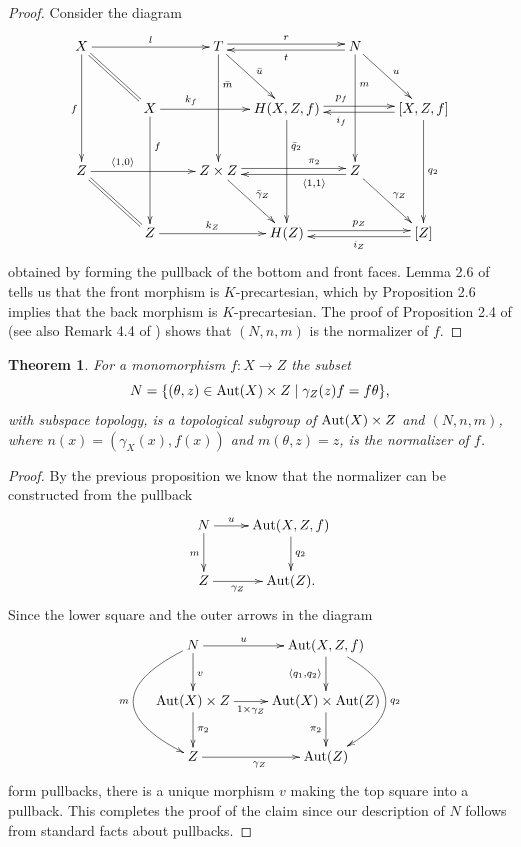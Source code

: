 \documentclass{article}
\newcommand{\Aut}{\textnormal{Aut}}
\newtheorem{theorem}{Theorem}[section]
\begin{document}
\begin{proof}
Consider the diagram
\[
\xymatrix@!@C=-1ex@R=-2ex{
X
\ar[rr]^-{l}
\ar[dd]_{f}
\ar@{=}[rd]
&
&
T
\ar@<0.5ex>[rr]^-{r}
\ar[dd]^(0.3){\bar m}
\ar[rd]^{\bar u}
&
&
N
\ar@<0.5ex>[ll]^-{t}
\ar[dd]^(0.3){m}
\ar[rd]^{u}
\\
&
X
\ar[dd]^(0.3){f}
\ar[rr]^(0.3){k_f}
&
&
H(X,Z,f)
\ar@<0.5ex>[rr]^(0.4){p_f}
\ar[dd]^(0.3){\bar q_2}
&
&
[X,Z,f]
\ar@<0.5ex>[ll]^(0.6){i_f}
\ar[dd]^{q_2}
\\
Z
\ar[rr]^(0.3){\langle 1,0\rangle}
\ar@{=}[rd]
&
&
Z\times Z
\ar@<0.5ex>[rr]^(0.7){\pi_2}
\ar[rd]^{\bar \gamma_Z}
&
&
Z
\ar@<0.5ex>[ll]^(0.3){\langle 1,1 \rangle}
\ar[rd]^{\gamma_Z}
\\
&
Z
\ar[rr]^-{k_Z}
&
&
H(Z)
\ar@<0.5ex>[rr]^-{p_Z}
&
&
[Z]
\ar@<0.5ex>[ll]^-{i_Z}
}
\]
obtained by forming the pullback of the bottom and front faces.
Lemma 2.6 of \cite{GRAY:2017} tells us that the front morphism is $K$-precartesian,
which by Proposition 2.6 \cite{BOURN_GRAY:2015} implies that the back morphism is $K$-precartesian.
The proof of Proposition 2.4 of \cite{BOURN_GRAY:2015} (see also Remark 4.4 of \cite{GRAY:2017})
shows that $(N,n,m)$ is the normalizer of $f$.
\end{proof}
\begin{theorem}\label{theorem:normalizer}
For a monomorphism $f:X\to Z$ the subset
\[N=\{(\theta,z)\in \Aut(X)\times Z\mid \gamma_Z(z) f = f \theta\},\]
with subspace topology, is a topological subgroup of $\Aut(X)\times Z$
and $(N,n,m)$, where $n(x)=(\gamma_X(x),f(x))$ and $m(\theta,z)=z$,
is the normalizer of $f$.
\end{theorem}
\begin{proof}
By the previous proposition we know that the normalizer can be constructed from the pullback
\[
\xymatrix{
N
\ar[d]_{m}
\ar[r]^-{u}
&
\Aut(X,Z,f)
\ar[d]^{q_2}
\\
Z
\ar[r]_-{\gamma_Z}
&
\Aut(Z).
}
\]
Since the lower square and the outer arrows in the diagram
\[
\xymatrix{
N
\ar@/_10ex/[dd]_{m}
\ar[r]^-{u}
\ar[d]^{v}
&
\Aut(X,Z,f)
\ar@/^10ex/[dd]^{q_2}
\ar[d]_{\langle q_1,q_2\rangle}
\\
\Aut(X)\times Z
\ar[d]^{\pi_2}
\ar[r]_-{1\times \gamma_Z}
&
\Aut(X)\times \Aut(Z)
\ar[d]_{\pi_2}
\\
Z
\ar[r]_{\gamma_Z}
&
\Aut(Z)
}
\]
form pullbacks, there is a unique morphism $v$ making the top square into a pullback.
This completes the proof of the claim since our description of $N$ follows
from standard facts about pullbacks.
\end{proof}
\end{document}
